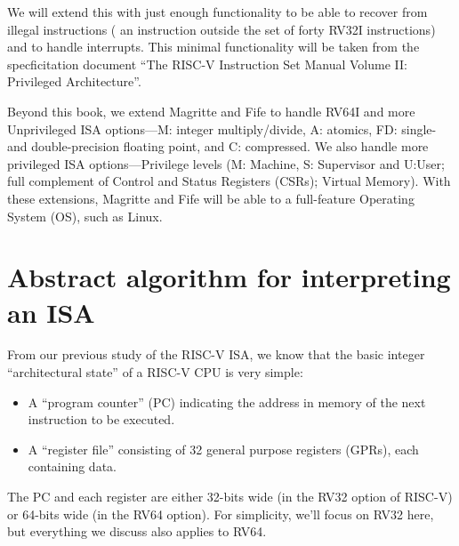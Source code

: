We will extend this with just enough functionality to be able to
recover from illegal instructions ({\ie} an instruction outside the
set of forty RV32I instructions) and to handle interrupts.  This
minimal functionality will be taken from the specficitation document
``The RISC-V Instruction Set Manual Volume II: Privileged
Architecture''\cite{RISCV_Priv_2021_12_03}.

Beyond this book, we extend Magritte and Fife to handle RV64I and more
Unprivileged ISA options---M: integer multiply/divide, A: atomics, FD:
single-and double-precision floating point, and C: compressed. We also
handle more privileged ISA options---Privilege levels (M: Machine, S:
Supervisor and U:User; full complement of Control and Status Registers
(CSRs); Virtual Memory).  With these extensions, Magritte and Fife
will be able to a full-feature Operating System (OS), such as Linux.


\section{Abstract algorithm for interpreting an ISA}

\label{Sec_ISA_Exec_Algorithm}

From our previous study of the RISC-V ISA, we know that the basic
integer ``architectural state'' of a RISC-V CPU is very simple:

\begin{itemize}

\item A ``program counter'' (PC) indicating the address in memory of
the next instruction to be executed.

\item A ``register file'' consisting of 32 general purpose registers
(GPRs), each containing data.

\end{itemize}

The PC and each register are either 32-bits wide (in the RV32 option
of RISC-V) or 64-bits wide (in the RV64 option).  For simplicity,
we'll focus on RV32 here, but everything we discuss also applies to
RV64.

